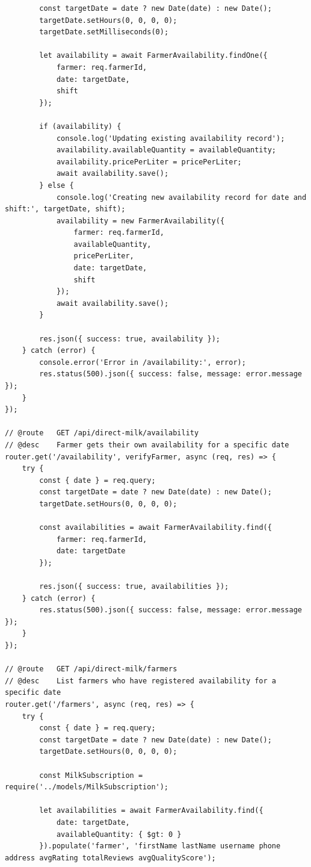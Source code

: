 \documentclass[12pt,a4paper]{report}
\begin{document}
\begin{lstlisting}
        const targetDate = date ? new Date(date) : new Date();
        targetDate.setHours(0, 0, 0, 0);
        targetDate.setMilliseconds(0);

        let availability = await FarmerAvailability.findOne({
            farmer: req.farmerId,
            date: targetDate,
            shift
        });

        if (availability) {
            console.log('Updating existing availability record');
            availability.availableQuantity = availableQuantity;
            availability.pricePerLiter = pricePerLiter;
            await availability.save();
        } else {
            console.log('Creating new availability record for date and shift:', targetDate, shift);
            availability = new FarmerAvailability({
                farmer: req.farmerId,
                availableQuantity,
                pricePerLiter,
                date: targetDate,
                shift
            });
            await availability.save();
        }

        res.json({ success: true, availability });
    } catch (error) {
        console.error('Error in /availability:', error);
        res.status(500).json({ success: false, message: error.message });
    }
});

// @route   GET /api/direct-milk/availability
// @desc    Farmer gets their own availability for a specific date
router.get('/availability', verifyFarmer, async (req, res) => {
    try {
        const { date } = req.query;
        const targetDate = date ? new Date(date) : new Date();
        targetDate.setHours(0, 0, 0, 0);

        const availabilities = await FarmerAvailability.find({
            farmer: req.farmerId,
            date: targetDate
        });

        res.json({ success: true, availabilities });
    } catch (error) {
        res.status(500).json({ success: false, message: error.message });
    }
});

// @route   GET /api/direct-milk/farmers
// @desc    List farmers who have registered availability for a specific date
router.get('/farmers', async (req, res) => {
    try {
        const { date } = req.query;
        const targetDate = date ? new Date(date) : new Date();
        targetDate.setHours(0, 0, 0, 0);

        const MilkSubscription = require('../models/MilkSubscription');

        let availabilities = await FarmerAvailability.find({
            date: targetDate,
            availableQuantity: { $gt: 0 }
        }).populate('farmer', 'firstName lastName username phone address avgRating totalReviews avgQualityScore');


\end{lstlisting}
\end{document}
